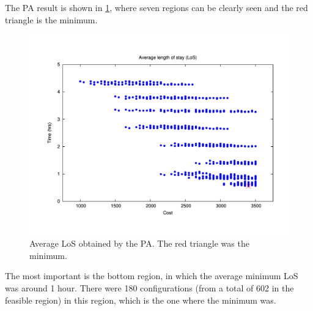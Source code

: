 The PA result is shown in \ref{subfig:pipe8-1}, where seven regions
can be clearly seen and the red triangle is the minimum.
\begin{figure}[H]
\noindent \begin{centering}
\includegraphics[width=0.95\columnwidth,height=0.25\paperheight]{figs4/v0/pipe-sorted-LoS_0-50_min}
\par\end{centering}

\caption{Average LoS obtained by the PA. The red triangle was the minimum.
\label{subfig:pipe8-1}}
\end{figure}
 The most important is the bottom region, in which the average minimum
LoS was around 1 hour. There were 180 configurations (from a total
of 602 in the feasible region) in this region, which is the one where
the minimum was.

